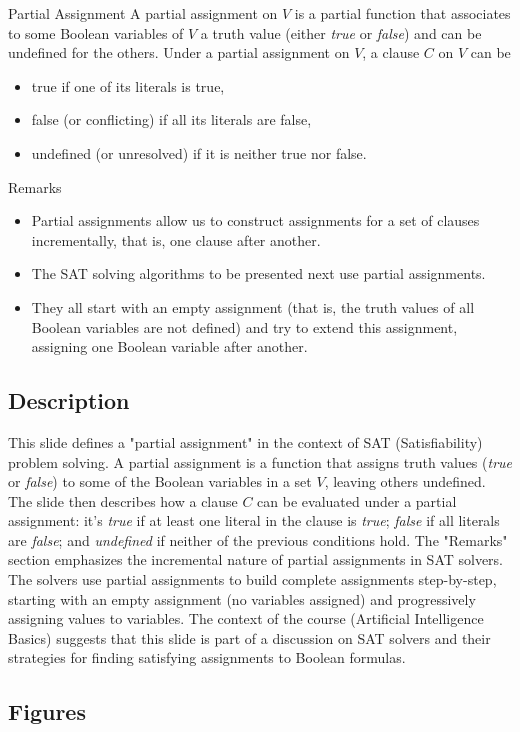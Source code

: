 \documentclass{article}%
\begin{document}
Partial Assignment
A partial assignment on $V$ is a partial function that associates to some Boolean variables of $V$ a truth value (either \textit{true} or \textit{false}) and can be undefined for the others.
Under a partial assignment on $V$, a clause $C$ on $V$ can be
\begin{itemize}
    \item true if one of its literals is true,
    \item false (or conflicting) if all its literals are false,
    \item undefined (or unresolved) if it is neither true nor false.
\end{itemize}
Remarks
\begin{itemize}
    \item Partial assignments allow us to construct assignments for a set of clauses incrementally, that is, one clause after another.
    \item The SAT solving algorithms to be presented next use partial assignments.
    \item They all start with an empty assignment (that is, the truth values of all Boolean variables are not defined) and try to extend this assignment, assigning one Boolean variable after another.
\end{itemize}
%
\subsection{Description}%
This slide defines a "partial assignment" in the context of SAT (Satisfiability) problem solving.  A partial assignment is a function that assigns truth values (\textit{true} or \textit{false}) to some of the Boolean variables in a set $V$, leaving others undefined.  The slide then describes how a clause $C$ can be evaluated under a partial assignment:  it's \textit{true} if at least one literal in the clause is \textit{true}; \textit{false} if all literals are \textit{false}; and \textit{undefined} if neither of the previous conditions hold.  The "Remarks" section emphasizes the incremental nature of partial assignments in SAT solvers.  The solvers use partial assignments to build complete assignments step-by-step, starting with an empty assignment (no variables assigned) and progressively assigning values to variables.  The context of the course (Artificial Intelligence Basics) suggests that this slide is part of a discussion on SAT solvers and their strategies for finding satisfying assignments to Boolean formulas.%
\subsection{Figures}%
\begin{figure}[H]%
\centering%
\end{figure}
\end{document}
